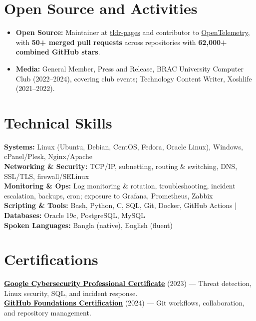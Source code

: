 \documentclass[a4paper]{article}
\begin{document}
\section{Open Source and Activities}
\begin{itemize}[leftmargin=0.15in, label={}, parsep=0pt]
\small
\item \textbf{Open Source:} Maintainer at \href{https://github.com/tldr-pages/tldr}{tldr-pages} and contributor to \href{https://github.com/open-telemetry}{OpenTelemetry}, with \textbf{50+ merged pull requests} across repositories with \textbf{62,000+ combined GitHub stars}.
\item \textbf{Media:} General Member, Press and Release, BRAC University Computer Club (2022--2024), covering club events; Technology Content Writer, Xoshlife (2021--2022).
\end{itemize}


\section{Technical Skills}
\begin{itemize}[leftmargin=0.15in, label={}]
\small{\item{
\textbf{Systems:} Linux (Ubuntu, Debian, CentOS, Fedora, Oracle Linux), Windows, cPanel/Plesk, Nginx/Apache\\
\textbf{Networking \& Security:} TCP/IP, subnetting, routing \& switching, DNS, SSL/TLS, firewall/SELinux\\
\textbf{Monitoring \& Ops:} Log monitoring \& rotation, troubleshooting, incident escalation, backups, cron; exposure to Grafana, Prometheus, Zabbix\\
\textbf{Scripting \& Tools:} Bash, Python, C, SQL, Git, Docker, GitHub Actions \;|\;
\textbf{Databases:} Oracle 19c, PostgreSQL, MySQL\\
\textbf{Spoken Languages:} Bangla (native), English (fluent)
}}
\end{itemize}


\section{Certifications}
 \begin{itemize}[leftmargin=0.15in, label={}]
    \small{\item{
    \href{https://coursera.org/share/44fd8f381cb39ac45892569cdf6f7674}{\textcolor{black}{\textbf{Google Cybersecurity Professional Certificate}}} (2023) --- Threat detection, Linux security, SQL, and incident response. \\
    \href{https://www.credly.com/badges/d5c30c19-02db-4c5f-9bc9-4bd0f4b6a89e/public_url}{\textcolor{black}{\textbf{GitHub Foundations Certification}}} (2024) --- Git workflows, collaboration, and repository management.
    }}
 \end{itemize}

\end{document}
